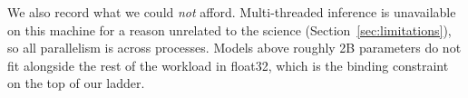 We also record what we could \emph{not} afford. Multi-threaded inference is
unavailable on this machine for a reason unrelated to the science
(Section~\ref{sec:limitations}), so all parallelism is across processes. Models
above roughly 2B parameters do not fit alongside the rest of the workload in
float32, which is the binding constraint on the top of our ladder.
